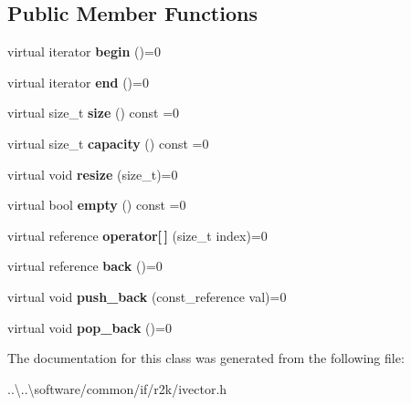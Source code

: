 \subsection*{Public Member Functions}
\begin{DoxyCompactItemize}
\item 
\mbox{\label{classr2k_1_1ivector_aa12c372c0503ee0f44686552673ef196}} 
virtual iterator {\bfseries begin} ()=0
\item 
\mbox{\label{classr2k_1_1ivector_a3f135257b47c1be208937eda8e28c2fc}} 
virtual iterator {\bfseries end} ()=0
\item 
\mbox{\label{classr2k_1_1ivector_a6b3b9b7efad8ae22e7e66105622fcb7f}} 
virtual size\+\_\+t {\bfseries size} () const =0
\item 
\mbox{\label{classr2k_1_1ivector_afed775f0a705c51683bc01a0b28f5f84}} 
virtual size\+\_\+t {\bfseries capacity} () const =0
\item 
\mbox{\label{classr2k_1_1ivector_aacd84b901da083ef9967da23085841d8}} 
virtual void {\bfseries resize} (size\+\_\+t)=0
\item 
\mbox{\label{classr2k_1_1ivector_a9254e80c621114b589a990f8c76e930a}} 
virtual bool {\bfseries empty} () const =0
\item 
\mbox{\label{classr2k_1_1ivector_a2f260ae445e62901bef166d2ba02d88d}} 
virtual reference {\bfseries operator\mbox{[}$\,$\mbox{]}} (size\+\_\+t index)=0
\item 
\mbox{\label{classr2k_1_1ivector_ae4cafbfcdd7dae88a7fab06e26ecb470}} 
virtual reference {\bfseries back} ()=0
\item 
\mbox{\label{classr2k_1_1ivector_aab84081f12ca539f11ae5027e9441882}} 
virtual void {\bfseries push\+\_\+back} (const\+\_\+reference val)=0
\item 
\mbox{\label{classr2k_1_1ivector_ab4565993d539642c5ae4cef03fd096a3}} 
virtual void {\bfseries pop\+\_\+back} ()=0
\end{DoxyCompactItemize}


The documentation for this class was generated from the following file\+:\begin{DoxyCompactItemize}
\item 
..\textbackslash{}..\textbackslash{}software/common/if/r2k/ivector.\+h\end{DoxyCompactItemize}
